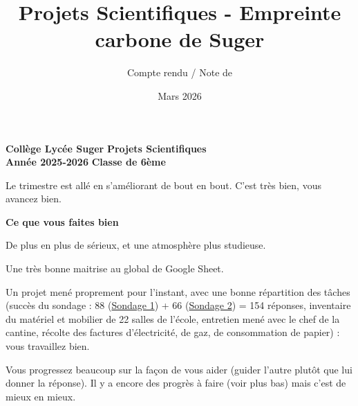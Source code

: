 \documentclass[answers]{exam}
\title{Projets Scientifiques - Empreinte carbone de Suger}
\author{Compte rendu / Note de \varPrenom{} \varNom{}}
\date{Mars 2026}
\newcommand{\varClasse}{6ème}
\begin{document}
\textbf{Collège Lycée Suger}
\hfill
\textbf{Projets Scientifiques} \\

\textbf{Année 2025-2026}
\hfill
\textbf{Classe de \varClasse{}} \par

{\let\newpage\relax\maketitle}





\begin{tcolorbox}[
  enhanced,
  colback=myindbg,
  colframe=myindfr,
  title=Feedback général - Destiné à l'ensemble de la classe,
  arc=4mm,
  boxsep=4pt,
  boxrule=0.6mm,
]
Le trimestre est allé en s'améliorant de bout en bout. C'est très bien, vous avancez bien.
\vspace{0.5em}

\textbf{Ce que vous faites bien}
\begin{compactitem}
    \item De plus en plus de sérieux, et une atmosphère plus studieuse.
    \item Une très bonne maitrise au global de Google Sheet.
    \item Un projet mené proprement pour l'instant, avec une bonne répartition des tâches (succès du sondage : 88 (\href{https://docs.google.com/forms/d/1roBgY880pU_klGW_UVBY_PlMnMh9UaXrXG6wG-RUfMs/edit\#responses}{Sondage 1}) + 66 (\href{https://docs.google.com/forms/d/1EtACQ4j_n1cYJjlsWLYTiQ1ARf1kiITT0zNVOO2K_hM/edit\#responses}{Sondage 2}) = 154 réponses, inventaire du matériel et mobilier de 22 salles de l'école, entretien mené avec le chef de la cantine, récolte des factures d'électricité, de gaz, de consommation de papier) : vous travaillez bien.
    \item Vous progressez beaucoup sur la façon de vous aider (guider l'autre plutôt que lui donner la réponse). Il y a encore des progrès à faire (voir plus bas) mais c'est de mieux en mieux.
\end{compactitem}
\vspace{0.5em}


\end{tcolorbox}
\end{document}
